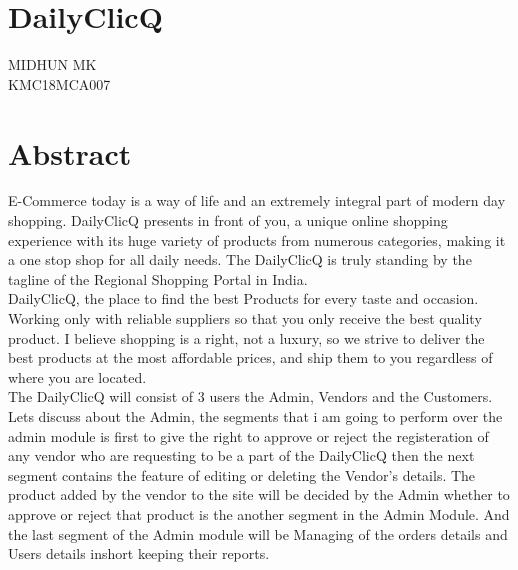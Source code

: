 \documentclass[a4paper,12pt]{report}
\begin{document}
\chapter*{\centering DailyClicQ}
\begin{center}
{\Large  MIDHUN MK }\\

{\large KMC18MCA007}

\end{center}
\chapter*{\centering Abstract}

	\hspace*{12pt} E-Commerce today is a way of life and an extremely integral part of modern day shopping. DailyClicQ presents in front of you, a unique online shopping experience with its huge variety of products from numerous categories, making it a one stop shop for all daily needs. The DailyClicQ is truly standing by the tagline of the Regional Shopping Portal in India.\\

\hspace*{12pt}DailyClicQ, the place to find the best Products for every taste and occasion. Working only with reliable suppliers so that you only receive the best quality product. I believe shopping is a right, not a luxury, so we strive to deliver the best products at the most affordable prices, and ship them to you regardless of where you are located.\\
\newpage
\hspace*{12pt}The DailyClicQ will consist of 3 users the Admin, Vendors and the Customers. Lets discuss about the Admin, the segments that i am going to perform over the admin module is first to give the right to approve or reject the registeration of any vendor who are requesting to be a part of the DailyClicQ then the next segment contains the feature of editing or deleting the Vendor's details. The product added by the vendor to the site will be decided by the Admin whether to approve or reject that product is the another segment in the Admin Module. And the last segment of the Admin module will be Managing of the orders details and Users details inshort keeping their reports.\\
\end{document}
